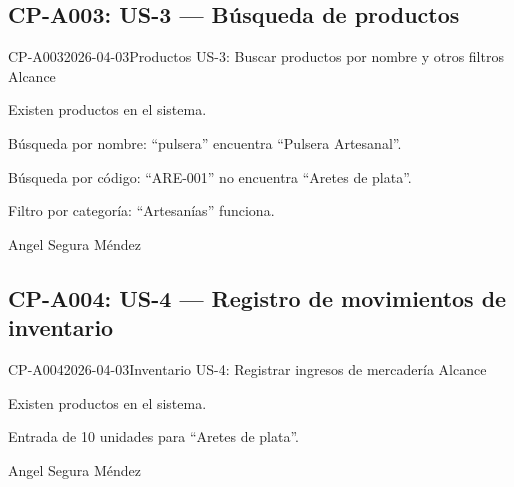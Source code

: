 \subsection{CP-A003: US-3 --- Búsqueda de productos}
\def\cpPasos{%
  \item Navegar a Productos.
  \item Buscar ``pulsera'' por nombre; verificar resultados.
  \item Buscar ``ARE'' en el buscador.
  \item Buscar código completo ``ARE-001''.
  \item Filtrar por categoría ``Artesanías''.}
\def\cpResultadoE{%
  \item La búsqueda funciona por nombre y código.}
\def\cpResultadoO{La búsqueda por nombre y el filtro por categoría funcionan.
  Sin embargo, \textcolor{rojo}{la búsqueda no encuentra productos por código} ---
  al buscar ``ARE'' o ``ARE-001'' no retorna resultados. El buscador solo filtra por
  nombre. (Ver HAL-002)}
\casoprueba
  {CP-A003}{2026-04-03}{Productos}
  {US-3: Buscar productos por nombre y otros filtros}
  {Alcance}{\estadoParcial}
  {\item Existen productos en el sistema.}
  {\item Búsqueda por nombre: ``pulsera'' \arr{} encuentra ``Pulsera Artesanal''.
   \item Búsqueda por código: ``ARE-001'' \arr{} no encuentra ``Aretes de plata''.
   \item Filtro por categoría: ``Artesanías'' \arr{} funciona.}
  {Angel Segura Méndez}

\subsection{CP-A004: US-4 --- Registro de movimientos de inventario}
\def\cpPasos{%
  \item Navegar a Inventario.
  \item Registrar entrada de mercadería.
  \item Verificar que el stock aumenta.
  \item Intentar ver el historial de movimientos registrados.}
\def\cpResultadoE{%
  \item Se pueden registrar ingresos y ver el historial de movimientos.}
\def\cpResultadoO{El registro de entradas funciona y el stock se actualiza. Sin embargo,
  \textcolor{rojo}{no existe opción para ver el historial de movimientos} en el módulo
  de Inventario. (Ver HAL-003)}
\casoprueba
  {CP-A004}{2026-04-03}{Inventario}
  {US-4: Registrar ingresos de mercadería}
  {Alcance}{\estadoParcial}
  {\item Existen productos en el sistema.}
  {\item Entrada de 10 unidades para ``Aretes de plata''.}
  {Angel Segura Méndez}

